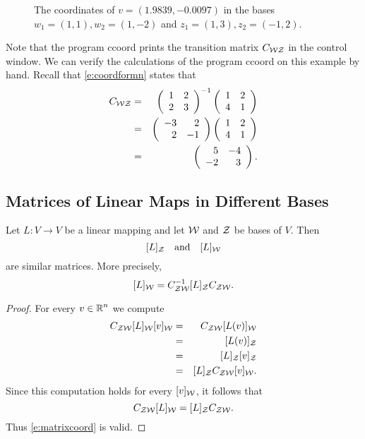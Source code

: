 \documentclass{ximera}
\begin{document}
\begin{figure*}[htb]
     \centerline{%
	}
     \caption{The coordinates of $v=(1.9839,-0.0097)$ in the bases
	$w_1=(1,1), w_2=(1,-2)$ and $z_1=(1,3),z_2=(-1,2)$.}
     \label{F:2coords}
\end{figure*}

Note that the program {\sf ccoord} prints the transition matrix
$C_{\cal WZ}$ in the \Matlab control window.  We can verify the
calculations of the program {\sf ccoord} on this example by hand.
Recall that \eqref{e:coordformn} states that
\begin{eqnarray*}
C_{\cal WZ} & = & \left(\begin{array}{rr} 1 & 2\\ 2 &3\end{array}\right)^{-1}\left(\begin{array}{rr} 1 & 2\\ 4 &1\end{array}\right) \\
& = & \left(\begin{array}{rr} -3 & 2\\ 2 &-1\end{array}\right)\left(\begin{array}{rr} 1 & 2\\ 4 &1\end{array}\right) \\
& = & \left(\begin{array}{rr} 5 & -4\\ -2 &3\end{array}\right).
\end{eqnarray*}


\subsection*{Matrices of Linear Maps in Different Bases}

\begin{theorem} \label{T:matrixcoord}
Let $L:V\to V$ be a linear mapping and let
${\cal W}$ and ${\cal Z}$ be bases of $V$.  Then
\[
[L]_{\cal Z} \quad\mbox{and}\quad [L]_{\cal W}
\]
are similar  matrices.  More precisely,
\begin{equation}  \label{e:matrixcoord}
[L]_{\cal W} = C_{{\cal Z}{\cal W}}^{-1} [L]_{\cal Z} C_{{\cal Z}{\cal W}}.
\end{equation}
\end{theorem}

\begin{proof}  For every $v\in\mbox{$\Bbb{R}$}^n$ we compute
\begin{eqnarray*}
C_{{\cal Z}{\cal W}}[L]_{\cal W}[v]_{\cal W} & = &
C_{{\cal Z}{\cal W}}[L(v)]_{\cal W} \\
& = & [L(v)]_{\cal Z}  \\
& = & [L]_{\cal Z}[v]_{\cal Z} \\
& = & [L]_{\cal Z} C_{{\cal Z}{\cal W}}[v]_{\cal W}.
\end{eqnarray*}
Since this computation holds for every $[v]_{\cal W}$, it follows that
\[
C_{{\cal Z}{\cal W}}[L]_{\cal W} = [L]_{\cal Z} C_{{\cal Z}{\cal W}}.
\]
Thus \eqref{e:matrixcoord} is valid.  \end{proof}





\EXER

\end{document}
